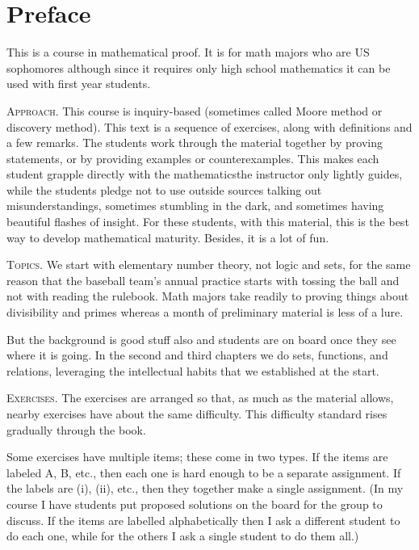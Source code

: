 \chapter*{Preface}

This is a course in mathematical proof. 
It is for math majors who are US sophomores although since
it requires only high school mathematics
it can be used with first year students.



\medskip
\noindent\textsc{Approach.}
This course is inquiry-based (sometimes called Moore method 
or discovery method).
This text is a sequence of exercises,
along with definitions and a few remarks.
The students work through the material together by
proving statements, or by providing examples or counterexamples.
This makes each student grapple directly with the 
mathematics\Dash the instructor only 
lightly guides, while the students pledge not to use outside sources\Dash
talking out misunderstandings, 
sometimes stumbling in the dark, and sometimes
having beautiful flashes of insight.
For these students, with this material,
this is the best way to develop mathematical maturity.
Besides, it is a lot of fun.


\medskip
\noindent\textsc{Topics.}
We start with elementary number theory, not logic and sets, 
for the same reason
that the baseball team's annual practice starts with tossing the ball and 
not with reading the rulebook.
Math majors take readily to proving things about
divisibility and primes 
whereas a month of preliminary material is less of a lure.

But the background is good stuff also and 
students are on board once they see where it is going.
In the second and third chapters we do
sets, functions, and relations, leveraging the
intellectual habits that we established at the start.



\medskip
\noindent\textsc{Exercises.}
The exercises are arranged so that, as much as the material allows,
nearby exercises have about the same difficulty.
This difficulty standard rises gradually through the book.

Some exercises have multiple items; these come in two types.
If the items are labeled \textsc{A}, \textsc{B}, etc., 
then each one is hard enough to be a separate assignment.
If the labels are (i), (ii), etc., then they together make
a single assignment.
(In my course I have students put proposed solutions on the board
for the group to discuss.
If the items are labelled alphabetically then I ask a different student
to do each one, while for the others I ask a single student to do them all.)



